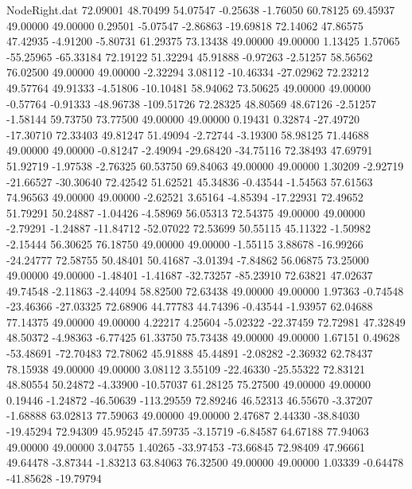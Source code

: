 \begin{filecontents}{NodeRight.dat}
  72.09001   48.70499   54.07547    -0.25638   -1.76050   60.78125   69.45937   49.00000   49.00000    0.29501   -5.07547   -2.86863  -19.69818
  72.14062   47.86575   47.42935    -4.91200   -5.80731   61.29375   73.13438   49.00000   49.00000    1.13425    1.57065  -55.25965  -65.33184
  72.19122   51.32294   45.91888    -0.97263   -2.51257   58.56562   76.02500   49.00000   49.00000   -2.32294    3.08112  -10.46334  -27.02962
  72.23212   49.57764   49.91333    -4.51806  -10.10481   58.94062   73.50625   49.00000   49.00000   -0.57764   -0.91333  -48.96738 -109.51726
  72.28325   48.80569   48.67126    -2.51257   -1.58144   59.73750   73.77500   49.00000   49.00000    0.19431    0.32874  -27.49720  -17.30710
  72.33403   49.81247   51.49094    -2.72744   -3.19300   58.98125   71.44688   49.00000   49.00000   -0.81247   -2.49094  -29.68420  -34.75116
  72.38493   47.69791   51.92719    -1.97538   -2.76325   60.53750   69.84063   49.00000   49.00000    1.30209   -2.92719  -21.66527  -30.30640
  72.42542   51.62521   45.34836    -0.43544   -1.54563   57.61563   74.96563   49.00000   49.00000   -2.62521    3.65164   -4.85394  -17.22931
  72.49652   51.79291   50.24887    -1.04426   -4.58969   56.05313   72.54375   49.00000   49.00000   -2.79291   -1.24887  -11.84712  -52.07022
  72.53699   50.55115   45.11322    -1.50982   -2.15444   56.30625   76.18750   49.00000   49.00000   -1.55115    3.88678  -16.99266  -24.24777
  72.58755   50.48401   50.41687    -3.01394   -7.84862   56.06875   73.25000   49.00000   49.00000   -1.48401   -1.41687  -32.73257  -85.23910
  72.63821   47.02637   49.74548    -2.11863   -2.44094   58.82500   72.63438   49.00000   49.00000    1.97363   -0.74548  -23.46366  -27.03325
  72.68906   44.77783   44.74396    -0.43544   -1.93957   62.04688   77.14375   49.00000   49.00000    4.22217    4.25604   -5.02322  -22.37459
  72.72981   47.32849   48.50372    -4.98363   -6.77425   61.33750   75.73438   49.00000   49.00000    1.67151    0.49628  -53.48691  -72.70483
  72.78062   45.91888   45.44891    -2.08282   -2.36932   62.78437   78.15938   49.00000   49.00000    3.08112    3.55109  -22.46330  -25.55322
  72.83121   48.80554   50.24872    -4.33900  -10.57037   61.28125   75.27500   49.00000   49.00000    0.19446   -1.24872  -46.50639 -113.29559
  72.89246   46.52313   46.55670    -3.37207   -1.68888   63.02813   77.59063   49.00000   49.00000    2.47687    2.44330  -38.84030  -19.45294
  72.94309   45.95245   47.59735    -3.15719   -6.84587   64.67188   77.94063   49.00000   49.00000    3.04755    1.40265  -33.97453  -73.66845
  72.98409   47.96661   49.64478    -3.87344   -1.83213   63.84063   76.32500   49.00000   49.00000    1.03339   -0.64478  -41.85628  -19.79794

\end{filecontents}
